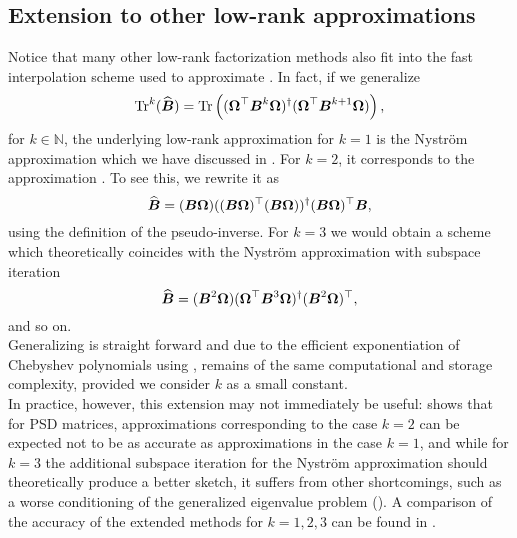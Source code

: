
\subsection{Extension to other low-rank approximations}
\label{subsec:3-nystrom-other-low-rank}

Notice that many other low-rank factorization methods \cite{halko2011finding,tropp2023randomized}
also fit into the fast interpolation scheme used to approximate .
In fact, if we generalize
\begin{equation}
    \operatorname{Tr}^{k}(\widehat{\boldsymbol{B}})
        = \operatorname{Tr}\left((\boldsymbol{\Omega}^{\top} \boldsymbol{B}^k \boldsymbol{\Omega})^{\dagger} (\boldsymbol{\Omega}^{\top} \boldsymbol{B}^{k+1} \boldsymbol{\Omega}) \right),
    \label{equ:3-nystrom-trace-generalization}
\end{equation}
for $k \in \mathbb{N}$,
the underlying low-rank approximation for $k=1$ is the Nystr\"om approximation
which we have discussed in .
For $k=2$, it corresponds to the approximation .
To see this, we rewrite it as
\begin{equation}
    \widehat{\boldsymbol{B}} = (\boldsymbol{B} \boldsymbol{\Omega}) ((\boldsymbol{B} \boldsymbol{\Omega})^{\top} (\boldsymbol{B} \boldsymbol{\Omega}))^{\dagger} (\boldsymbol{B} \boldsymbol{\Omega})^{\top} \boldsymbol{B},
    \label{equ:3-nystrom-RSVD-rewritten}
\end{equation}
using the definition of the pseudo-inverse.
For $k=3$ we would obtain a scheme which theoretically coincides with the Nystr\"om
approximation with subspace iteration \cite{tropp2023randomized}
\begin{equation}
    \widehat{\boldsymbol{B}} = (\boldsymbol{B}^2 \boldsymbol{\Omega}) (\boldsymbol{\Omega}^{\top} \boldsymbol{B}^3 \boldsymbol{\Omega})^{\dagger} (\boldsymbol{B}^2 \boldsymbol{\Omega})^{\top},
    \label{equ:3-nystrom-nystrom-SI}
\end{equation}
and so on.\\

Generalizing  is straight forward and
due to the efficient exponentiation of Chebyshev polynomials using
, remains of the same
computational and storage complexity, provided we consider $k$ as a small constant.\\

In practice, however, this extension may not immediately be useful: \cite[lemma~5.2]{tropp2023randomized}
shows that for \gls{PSD} matrices, approximations corresponding to the case $k=2$
can be expected not to be as accurate as approximations in the case $k=1$, and
while for $k=3$ the additional subspace iteration for the Nystr\"om approximation
should theoretically produce a better sketch, it suffers from other shortcomings,
such as a worse conditioning of the generalized eigenvalue problem ().
A comparison of the accuracy of the extended methods for $k=1, 2, 3$ can be
found in .

